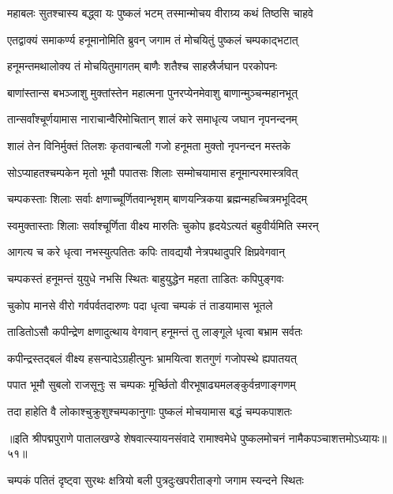 \twolineshloka
{महाबलः सुतश्चास्य बद्ध्वा यः पुष्कलं भटम्}
{तस्मान्मोचय वीराग्र्य कथं तिष्ठसि चाहवे}%

\twolineshloka
{एतद्वाक्यं समाकर्ण्य हनूमानोमिति ब्रुवन्}
{जगाम तं मोचयितुं पुष्कलं चम्पकाद्भटात्}%

\twolineshloka
{हनूमन्तमथालोक्य तं मोचयितुमागतम्}
{बाणैः शतैश्च साहस्रैर्जघान परकोपनः}%

\twolineshloka
{बाणांस्तान्स बभञ्जाशु मुक्तांस्तेन महात्मना}
{पुनरप्येनमेवाशु बाणान्मुञ्चन्महानभूत्}%

\twolineshloka
{तान्सर्वांश्चूर्णयामास नाराचान्वैरिमोचितान्}
{शालं करे समाधृत्य जघान नृपनन्दनम्}%

\twolineshloka
{शालं तेन विनिर्मुक्तं तिलशः कृतवान्बली}
{गजो हनूमता मुक्तो नृपनन्दन मस्तके}%

\twolineshloka
{सोऽप्याहतश्चम्पकेन मृतो भूमौ पपातसः}
{शिलाः सम्मोचयामास हनूमान्परमास्त्रवित्}%

\twolineshloka
{चम्पकस्ताः शिलाः सर्वाः क्षणाच्चूर्णितवान्भृशम्}
{बाणयन्त्रिकया ब्रह्मन्महच्चित्रमभूदिदम्}%

\twolineshloka
{स्वमुक्तास्ताः शिलाः सर्वाश्चूर्णिता वीक्ष्य मारुतिः}
{चुकोप हृदयेऽत्यतं बहुवीर्यमिति स्मरन्}%

\twolineshloka
{आगत्य च करे धृत्वा नभस्युत्पतितः कपिः}
{तावद्ययौ नेत्रपथादुपरि क्षिप्रवेगवान्}%

\twolineshloka
{चम्पकस्तं हनूमन्तं युयुधे नभसि स्थितः}
{बाहुयुद्धेन महता ताडितः कपिपुङ्गवः}%

\twolineshloka
{चुकोप मानसे वीरो गर्वपर्वतदारुणः}
{पदा धृत्वा चम्पकं तं ताडयामास भूतले}%

\twolineshloka
{ताडितोऽसौ कपीन्द्रेण क्षणादुत्थाय वेगवान्}
{हनूमन्तं तु लाङ्गूले धृत्वा बभ्राम सर्वतः}%

\twolineshloka
{कपीन्द्रस्तद्बलं वीक्ष्य हसन्पादेऽग्रहीत्पुनः}
{भ्रामयित्वा शतगुणं गजोपस्थे ह्यपातयत्}%

\twolineshloka
{पपात भूमौ सुबलो राजसूनुः स चम्पकः}
{मूर्च्छितो वीरभूषाढ्यमलङ्कुर्वन्रणाङ्गणम्}%

\twolineshloka
{तदा हाहेति वै लोकाश्चुक्रुशुश्चम्पकानुगाः}
{पुष्कलं मोचयामास बद्धं चम्पकपाशतः}%

॥इति श्रीपद्मपुराणे पातालखण्डे शेषवात्स्यायनसंवादे रामाश्वमेधे पुष्कलमोचनं नामैकपञ्चाशत्तमोऽध्यायः॥५१॥



\twolineshloka
{चम्पकं पतितं दृष्ट्वा सुरथः क्षत्रियो बली}
{पुत्रदुःखपरीताङ्गो जगाम स्यन्दने स्थितः}%

